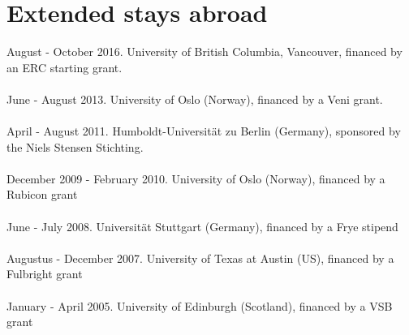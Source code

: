 \documentclass[a4paper,11pt]{article}
\begin{document}
\pagebreak

\section*{Extended stays abroad}

August - October 2016. University of British Columbia, Vancouver, financed by an ERC starting grant.\\\\
June - August 2013. University of Oslo (Norway), financed by a Veni grant.\\\\
April - August 2011.  Humboldt-Universit\"at zu Berlin (Germany), sponsored by the Niels Stensen Stichting.\\\\
December 2009 - February 2010. University of Oslo (Norway), financed by a Rubicon grant\\\\
June - July 2008.  Universit\"at Stuttgart (Germany), financed by a Frye stipend\\\\
Augustus - December 2007. University of Texas at Austin (US), financed by a Fulbright grant\\\\
January - April 2005. University of Edinburgh (Scotland), financed by a VSB grant\\\\
\end{document}
